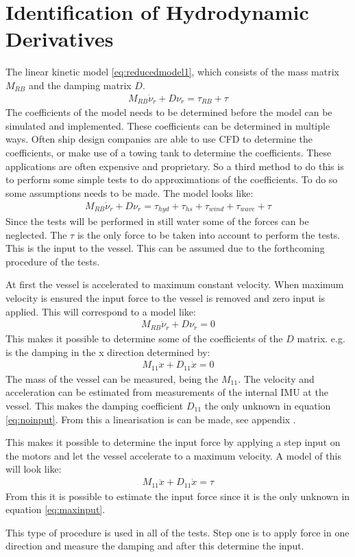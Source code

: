 \section{Identification of Hydrodynamic Derivatives}
The linear kinetic model \eqref{eq:reducedmodel1}, which consists of the mass matrix $M_{RB}$ and the damping matrix $D$.
\begin{align}
M_{RB} \dot \nu_r + D\nu_r = \tau_{RB} + \tau
\label{eq:reducedmodel1}
\end{align}
The coefficients of the model needs to be determined before the model can be simulated and implemented. These coefficients can be determined in multiple ways. Often ship design companies are able to use \ac{CFD} to determine the coefficients, or make use of a towing tank to determine the coefficients. These applications are often expensive and proprietary. So a third method to do this is to perform some simple tests to do approximations of the coefficients. To do so some assumptions needs to be made. The model looks like:
\begin{align}
M_{RB} \dot \nu_r + D\nu_r = \tau_{hyd} + \tau_{hs} + \tau_{wind} + \tau_{wave} + \tau
\end{align}
Since the tests will be performed in still water some of the forces can be neglected. The $\tau$ is the only force to be taken into account to perform the tests. This is the input to the vessel. This can be assumed due to the forthcoming procedure of the tests.

At first the vessel is accelerated to maximum constant velocity. When maximum velocity is ensured the input force to the vessel is removed and zero input is applied. This will correspond to a model like:
\begin{align}
M_{RB} \dot \nu_r + D\nu_r = 0
\label{eq:decelmodel}
\end{align}
This makes it possible to determine some of the coefficients of the $D$ matrix. e.g. is the damping in the x direction determined by:
\begin{align} 
M_{11} \ddot x + D_{11} \dot x = 0
\label{eq:noinput}
\end{align}
The mass of the vessel can be measured, being the $M_{11}$. The velocity and acceleration can be estimated from measurements of the internal \ac{IMU} at the vessel. This makes the damping coefficient $D_{11}$ the only unknown in equation \ref{eq:noinput}. From this a linearisation is can be made, see appendix .

This makes it possible to determine the input force by applying a step input on the motors and let the vessel accelerate to a maximum velocity. A model of this will look like:
\begin{align} 
M_{11} \ddot x + D_{11} \dot x = \tau
\label{eq:maxinput}
\end{align}
From this it is possible to estimate the input force since it is the only unknown in equation \ref{eq:maxinput}.

This type of procedure is used in all of the tests. Step one is to apply force in one direction and measure the damping and after this determine the input.



